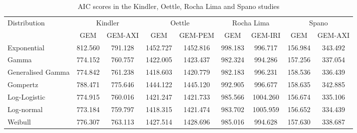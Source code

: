 \begin{table}[h]
    \centering
    \begin{tabular}{lcccccccc}
    \hline
    \multirow{2}{*}{Distribution} & \multicolumn{2}{c}{Kindler} & \multicolumn{2}{c}{Oettle} & \multicolumn{2}{c}{Rocha Lima} & \multicolumn{2}{c}{Spano} \\ \cline{2-9} 
                                  & GEM          & GEM-AXI      & GEM          & GEM-PEM     & GEM           & GEM-IRI        & GEM         & GEM-AXI     \\ \hline
    Exponential                   & 812.560      & 791.128      & 1452.727     & 1452.816    & 998.183       & 996.717        & 156.984     & 343.492     \\
    Gamma                         & 774.152      & 760.757      & 1422.005     & 1423.437    & 982.324       & 994.286        & 157.256     & 337.054     \\
    Generalised Gamma             & 774.842      & 761.238      & 1418.603     & 1420.779    & 982.183       & 996.231        & 158.536     & 336.439     \\
    Gompertz                      & 788.471      & 775.646      & 1444.122     & 1445.120    & 992.905       & 996.677        & 158.635     & 342.885     \\
    Log-Logistic                  & 774.915      & 760.016      & 1421.247     & 1421.733    & 985.566       & 1004.260       & 156.674     & 335.106     \\
    Log-normal                    & 773.184      & 759.797      & 1418.315     & 1421.474    & 983.702       & 1005.959       & 156.652     & 334.439     \\
    Weibull                       & 776.307      & 763.113      & 1427.514     & 1428.696    & 985.016       & 994.628        & 157.630     & 338.687     \\ \hline
    \end{tabular}
    \caption{AIC scores in the Kindler, Oettle, Rocha Lima and Spano studies}
    \label{AIC2}
\end{table}